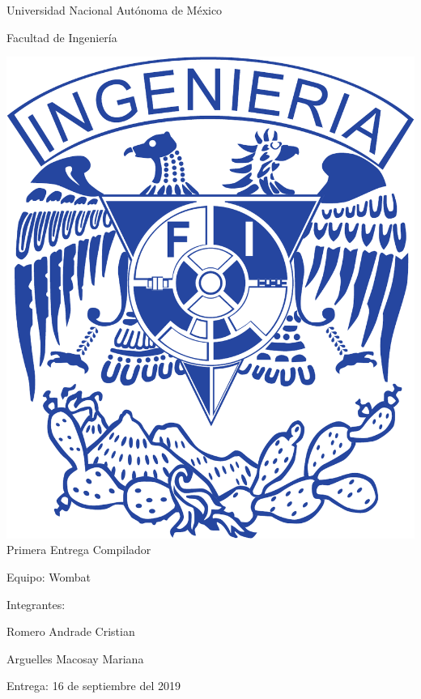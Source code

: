 \documentclass{article}
\begin{document}
\begin{titlepage}
  \begin{center}
    \Huge{Universidad Nacional Autónoma de México}

    \Huge{Facultad de Ingeniería}
    \vfill

    \includegraphics[scale=.3]{../img/UNAM_INGENIERIA}
    \vfill
    \Large{Primera Entrega Compilador}

    
    \vfill
    \LARGE{Equipo: Wombat}
    \vfill
  \end{center}  
  
  \Large{Integrantes:
    
    \hspace{2cm}Romero Andrade Cristian
    
    \hspace{2cm}Arguelles Macosay Mariana}
  \vfill
  \Large{Entrega: 16 de septiembre del 2019}
  

  
  
\end{titlepage}
\end{document}
